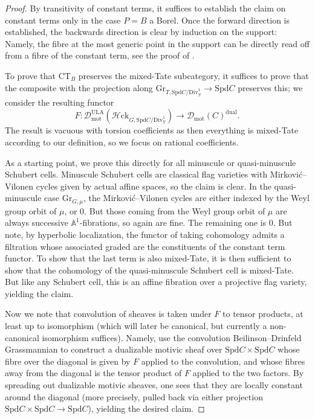 \documentclass[11pt]{amsart}
\numberwithin{equation}{section}
\numberwithin{theorem}{section}
\theoremstyle{definition}
\newcommand{\Hloc}{{\mathcal H}{\mathrm{ck}}}
\begin{document}
\begin{proof} By transitivity of constant terms, it suffices to establish the claim on constant terms only in the case $P=B$ a Borel. Once the forward direction is established, the backwards direction is clear by induction on the support: Namely, the fibre at the most generic point in the support can be directly read off from a fibre of the constant term, see the proof of \cite[Proposition VI.4.2]{FarguesScholze}.

To prove that $\mathrm{CT}_B$ preserves the mixed-Tate subcategory, it suffices to prove that the composite with the projection along $\mathrm{Gr}_{T,\mathrm{Spd} C/\mathrm{Div}^1_{\mathcal Y}}\to \mathrm{Spd} C$ preserves this; we consider the resulting functor
\[
F: \mathcal D_{\mathrm{mot}}^{\mathrm{ULA}}(\Hloc_{G,\mathrm{Spd} C/\mathrm{Div}^1_{\mathcal Y}})\to \mathcal D_{\mathrm{mot}}(C)^{\mathrm{dual}}.
\]
The result is vacuous with torsion coefficients as then everything is mixed-Tate according to our definition, so we focus on rational coefficients.

As a starting point, we prove this directly for all minuscule or quasi-minuscule Schubert cells. Minuscule Schubert cells are classical flag varieties with Mirkovi\'c--Vilonen cycles given by actual affine spaces, so the claim is clear. In the quasi-minuscule case $\mathrm{Gr}_{G,\mu}$, the Mirkovi\'c--Vilonen cycles are either indexed by the Weyl group orbit of $\mu$, or $0$. But those coming from the Weyl group orbit of $\mu$ are always successive $\mathbb A^1$-fibrations, so again are fine. The remaining one is $0$. But note, by hyperbolic localization, the functor of taking cohomology admits a filtration whose associated graded are the constituents of the constant term functor. To show that the last term is also mixed-Tate, it is then sufficient to show that the cohomology of the quasi-minuscule Schubert cell is mixed-Tate. But like any Schubert cell, this is an affine fibration over a projective flag variety, yielding the claim.

Now we note that convolution of sheaves is taken under $F$ to tensor products, at least up to isomorphism (which will later be canonical, but currently a non-canonical isomorphism suffices). Namely, use the convolution Beilinson--Drinfeld Grassmannian to construct a dualizable motivic sheaf over $\mathrm{Spd} C\times \mathrm{Spd} C$ whose fibre over the diagonal is given by $F$ applied to the convolution, and whose fibres away from the diagonal is the tensor product of $F$ applied to the two factors. By spreading out dualizable motivic sheaves, one sees that they are locally constant around the diagonal (more precisely, pulled back via either projection $\mathrm{Spd} C\times \mathrm{Spd} C\to \mathrm{Spd} C$), yielding the desired claim.


\end{proof}
\end{document}
